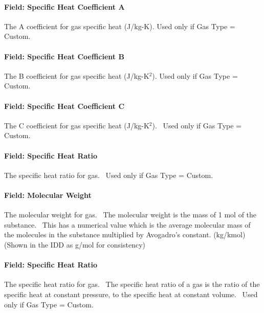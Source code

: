 \paragraph{Field: Specific Heat Coefficient A}\label{field-specific-heat-coefficient-a-1}

The A coefficient for gas specific heat (J/kg-K). Used only if Gas Type = Custom.

\paragraph{Field: Specific Heat Coefficient B}\label{field-specific-heat-coefficient-b-1}

The B coefficient for gas specific heat (J/kg-K\(^{2}\)). Used only if Gas Type = Custom.

\paragraph{Field: Specific Heat Coefficient C}\label{field-specific-heat-coefficient-c-1}

The C coefficient for gas specific heat (J/kg-K\(^{2}\)).~ Used only if Gas Type = Custom.

\paragraph{Field: Specific Heat Ratio}\label{field-specific-heat-ratio-2}

The specific heat ratio for gas.~ Used only if Gas Type = Custom.

\paragraph{Field: Molecular Weight}\label{field-molecular-weight-1}

The molecular weight for gas.~ The molecular weight is the mass of 1 mol of the substance.~ This has a numerical value which is the average molecular mass of the molecules in the substance multiplied by Avogadro's constant. (kg/kmol) (Shown in the IDD as g/mol for consistency)

\paragraph{Field: Specific Heat Ratio}\label{field-specific-heat-ratio-3}

The specific heat ratio for gas.~ The specific heat ratio of a gas is the ratio of the specific heat at constant pressure, to the specific heat at constant volume.~ Used only if Gas Type = Custom.

